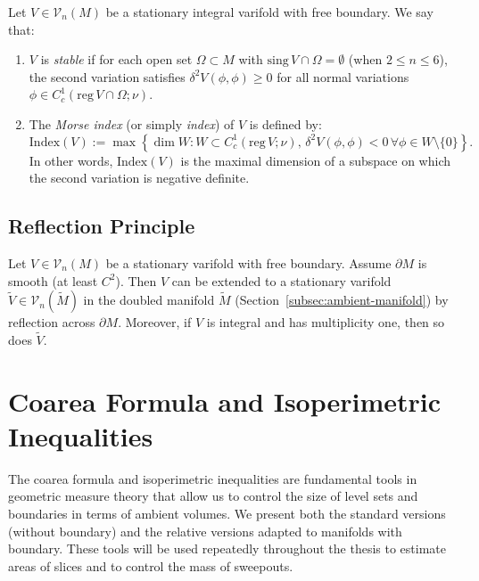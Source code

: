 \begin{definition}\label{def:morse-index-varifold}
Let $V \in \mathcal{V}_n(M)$ be a stationary integral varifold with free boundary. We say that:
\begin{enumerate}[label=(\roman*)]
    \item $V$ is \emph{stable} if for each open set $\Omega \subset M$ with $\mathrm{sing}\, V \cap \Omega = \emptyset$
    (when $2 \leq n \leq 6$), the second variation satisfies $\delta^2 V(\phi, \phi) \geq 0$ for all
    normal variations $\phi \in C^1_c(\mathrm{reg}\, V \cap \Omega; \nu)$.

    \item The \emph{Morse index} (or simply \emph{index}) of $V$ is defined by:
    \[
        \mathrm{Index}(V) := \max\left\{ \dim W : W \subset C^1_c(\mathrm{reg}\, V; \nu), \, \delta^2 V(\phi, \phi) < 0 \, \forall \phi \in W \setminus \{0\} \right\}.
    \]
    In other words, $\mathrm{Index}(V)$ is the maximal dimension of a subspace on which the second
    variation is negative definite.
\end{enumerate}
\end{definition}
\subsection{Reflection Principle}\label{subsec:reflection}
\begin{lemma}\label{lem:reflection-principle}
Let $V \in \mathcal{V}_n(M)$ be a stationary varifold with free boundary. Assume $\partial M$ is smooth (at least $C^2$). Then $V$ can be extended to a stationary varifold $\widetilde{V} \in \mathcal{V}_n(\widetilde{M})$ in the doubled manifold $\widetilde{M}$ (Section~\ref{subsec:ambient-manifold}) by reflection across $\partial M$. Moreover, if $V$ is integral and has multiplicity one, then so does $\widetilde{V}$.
\end{lemma}

\section{Coarea Formula and Isoperimetric Inequalities}\label{sec:coarea}
The coarea formula and isoperimetric inequalities are fundamental tools in geometric measure theory that allow us to control the size of level sets and boundaries in terms of ambient volumes. We present both the standard versions (without boundary) and the relative versions adapted to manifolds with boundary. These tools will be used repeatedly throughout the thesis to estimate areas of slices and to control the mass of sweepouts.

